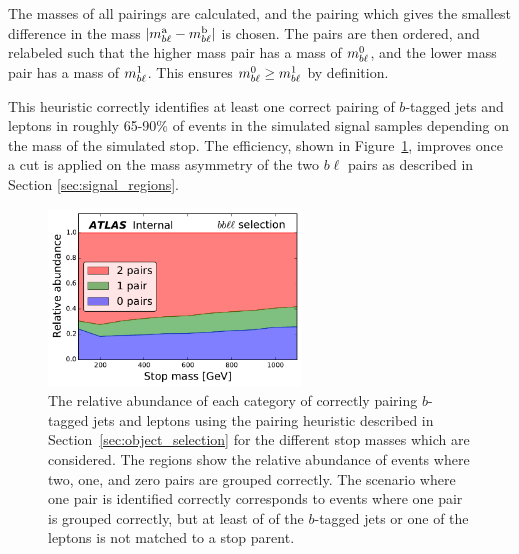 The masses of all pairings are calculated, and the pairing which gives the 
smallest difference in the mass $|m_{b\ell}^\mathrm{a} - m_{b\ell}^\mathrm{b}|$
is chosen.
The pairs are then ordered, and relabeled such that the higher mass pair has a
mass of $m_{b\ell}^{0}$, and the lower mass pair has a mass of $m_{b\ell}^{1}$.
This ensures $m_{b\ell}^{0} \geq m_{b\ell}^{1}$ by definition.

This heuristic correctly identifies at least one correct pairing of $b$-tagged
jets and leptons in roughly 65-90\% of events in the simulated signal samples
depending on the mass of the simulated stop. The efficiency, shown in
Figure~\ref{fig:pairing_eff}, improves once a cut is applied on the mass
asymmetry of the two $b\ell$ pairs as described in Section
\ref{sec:signal_regions}.

\begin{figure}[ht]
  \centering
  \includegraphics[width=0.60\textwidth]
    {figs/blstop/PairingEfficiencies/pairing_abundance__inclusive.pdf}
  \caption{The relative abundance of each category of correctly pairing
    $b$-tagged jets and leptons using the pairing heuristic described in
    Section~\ref{sec:object_selection} for the different stop masses which are
    considered.
    The regions show the relative abundance of events where two, one, and zero
    pairs are grouped correctly.
    The scenario where one pair is identified correctly corresponds to events
    where one pair is grouped correctly, but at least of of the $b$-tagged jets
    or one of the leptons is not matched to a stop parent.
  }
  \label{fig:pairing_eff}
\end{figure}

